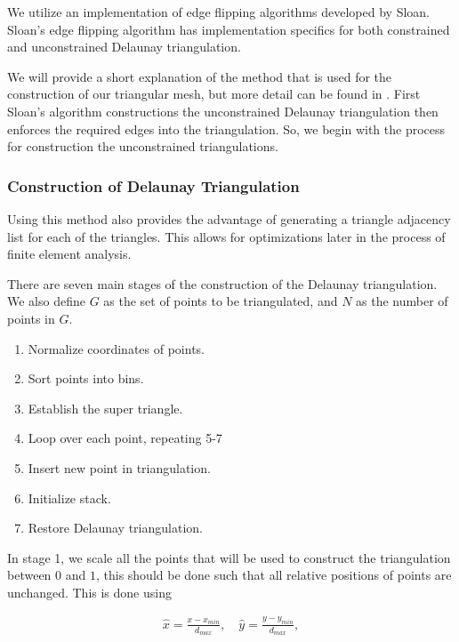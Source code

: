 \documentclass[../fem.tex]{subfiles}
\begin{document}
We utilize an implementation of edge flipping algorithms developed by Sloan.
Sloan's edge flipping algorithm has implementation specifics for both
constrained and unconstrained Delaunay triangulation.

We will provide a short explanation of the method that is used for the
construction of our triangular mesh, but more detail can be found in
\cite{S_DT}\cite{S_CDT}. First Sloan's algorithm constructions the
unconstrained Delaunay triangulation then enforces the required edges into the
triangulation. So, we begin with the process for construction the unconstrained
triangulations.

\subsubsection{Construction of Delaunay Triangulation}%
\label{ssub:construction_of_delaunay_triangulation}

Using this method also provides the advantage of generating a triangle
adjacency list for each of the triangles. This allows for optimizations later
in the process of finite element analysis.

There are seven main stages of the construction of the Delaunay triangulation.
We also define $G$ as the set of points to be triangulated, and $N$ as the
number of points in $G$.

\begin{enumerate}[label=\arabic*.]
  \item Normalize coordinates of points.
  \item Sort points into bins.
  \item Establish the super triangle.
  \item Loop over each point, repeating 5-7
  \item Insert new point in triangulation.
  \item Initialize stack.
  \item Restore Delaunay triangulation.
\end{enumerate}

In stage 1, we scale all the points that will be used to construct the
triangulation between $0$ and $1$, this should be done such that all relative
positions of points are unchanged. This is done using

\begin{align*}
  \hat{x}=\frac{x-x_{min}}{d_{max}},\quad\hat{y}=\frac{y-y_{min}}{d_{max}},
\end{align*}
\end{document}
